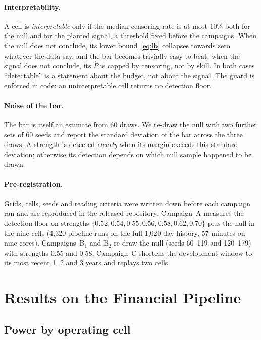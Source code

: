 \documentclass[11pt]{article}
\newcommand{\Pf}{\hat{P}}
\begin{document}
\paragraph{Interpretability.}
A cell is \emph{interpretable} only if the median censoring rate is at most 10\% both for the null and for the planted signal, a threshold fixed before the campaigns. When the null does not conclude, its lower bound~\eqref{eq:lb} collapses towards zero whatever the data say, and the bar becomes trivially easy to beat; when the signal does not conclude, its $\Pf$ is capped by censoring, not by skill. In both cases ``detectable'' is a statement about the budget, not about the signal. The guard is enforced in code: an uninterpretable cell returns no detection floor.

\paragraph{Noise of the bar.}
The bar is itself an estimate from 60 draws. We re-draw the null with two further sets of 60 seeds and report the standard deviation of the bar across the three draws. A strength is detected \emph{clearly} when its margin exceeds this standard deviation; otherwise its detection depends on which null sample happened to be drawn.

\paragraph{Pre-registration.}
Grids, cells, seeds and reading criteria were written down before each campaign ran and are reproduced in the released repository. Campaign~A measures the detection floor on strengths $\{0.52, 0.54, 0.55, 0.56, 0.58, 0.62, 0.70\}$ plus the null in the nine cells (4,320 pipeline runs on the full 1,020-day history, 57 minutes on nine cores). Campaigns~B$_1$ and B$_2$ re-draw the null (seeds 60--119 and 120--179) with strengths 0.55 and 0.58. Campaign~C shortens the development window to its most recent 1, 2 and 3 years and replays two cells.

\section{Results on the Financial Pipeline}
\label{sec:results}

\subsection{Power by operating cell}
\label{sec:cells}
\end{document}
